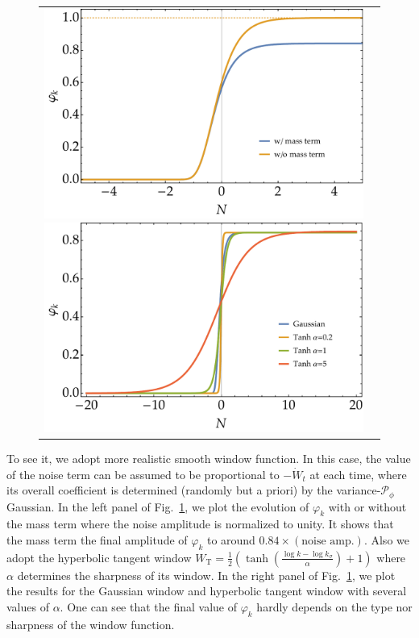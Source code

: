 \documentclass[aps, prd
, preprint
, nofootinbib 
]{revtex4-1}
\newcommand{\calP}{\mathcal{P}}
\begin{document}
\begin{figure}
	\centering
	\begin{tabular}{cc}
		\begin{minipage}{0.5\hsize}
			\centering
			\includegraphics[width=\hsize]{figs/Gaussian.pdf}
		\end{minipage}
		\begin{minipage}{0.5\hsize}
			\centering
			\includegraphics[width=\hsize]{figs/several_window.pdf}
		\end{minipage}
	\end{tabular}
	\caption{}
	\label{fig: phik}
\end{figure}

To see it, we adopt more realistic smooth window function. In this case, the value of the noise term can be assumed to be proportional to
$-\dot{W}_t$ at each time, where its overall coefficient is determined (randomly but a priori) by the variance-$\calP_\phi$ Gaussian.
In the left panel of Fig.~\ref{fig: phik}, we plot the evolution of $\varphi_k$ with or without the mass term where the noise amplitude is normalized
to unity. It shows that the mass term the final amplitude of $\varphi_k$ to around $0.84\times(\text{noise amp.})$.
Also we adopt the hyperbolic tangent window $W_\text{T}=\frac{1}{2}\left(\tanh\left(\frac{\log k-\log k_\sigma}{\alpha}\right)+1\right)$
where $\alpha$ determines the sharpness of its window. In the right panel of Fig.~\ref{fig: phik}, we plot the results for the Gaussian window
and hyperbolic tangent window with several values of $\alpha$. One can see that the final value of $\varphi_k$ hardly depends on the type nor sharpness
of the window function.
\end{document}
